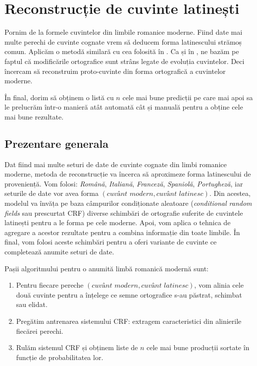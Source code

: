 \chapter{Reconstrucție de cuvinte latinești}
\label{chap:two}
Pornim de la formele cuvintelor din limbile romanice moderne. Fiind date mai multe perechi de cuvinte
cognate vrem să deducem forma latinescului strămoș comun. Aplicăm o metodă similară cu cea folosită
în \cite{theone}. Ca și în \cite{theone}, ne bazăm pe faptul că modificările ortografice sunt strâns
legate de evoluția cuvintelor. Deci încercam să reconstruim proto-cuvinte din forma ortografică a
cuvintelor moderne.

În final, dorim să obținem o listă cu $n$ cele mai bune predicții pe care mai apoi sa le prelucrăm
într-o manieră atât automată cât și manuală pentru a obține cele mai bune rezultate.

\section{Prezentare generala}
Dat fiind mai multe seturi de date de cuvinte cognate din limbi romanice moderne, metoda de 
reconstrucție va încerca să aproximeze forma latinescului de proveniență. Vom folosi: \textit{Română},
\textit{Italiană}, \textit{Franceză}, \textit{Spaniolă}, \textit{Portugheză}, iar seturile de date
vor avea forma $(\textit{cuvânt modern}, \textit{cuvânt latinesc})$. Din acestea, modelul va învăța 
pe baza câmpurilor condiționate aleatoare (\textit{conditional random fields} sau prescurtat CRF) 
diverse schimbări de ortografie suferite de cuvintele latinești pentru a le forma pe cele moderne. 
Apoi, vom aplica o tehnica de agregare a acestor rezultate pentru a combina informație din toate 
limbile. În final, vom folosi aceste schimbări pentru a oferi variante de cuvinte ce 
completează anumite seturi de date.

Pașii algoritmului pentru o anumită limbă romanică modernă sunt:

\begin{enumerate}
  \item Pentru fiecare pereche $(\textit{cuvânt modern}, \textit{cuvânt latinesc})$, vom alinia
    cele două cuvinte pentru a înțelege ce semne ortografice s-au păstrat, schimbat sau elidat.
  \item Pregătim antrenarea sistemului CRF: extragem caracteristici din alinierile fiecărei perechi.
  \item Rulăm sistemul CRF și obținem liste de $n$ cele mai bune producții sortate în funcție de
    probabilitatea lor.
\end{enumerate}

